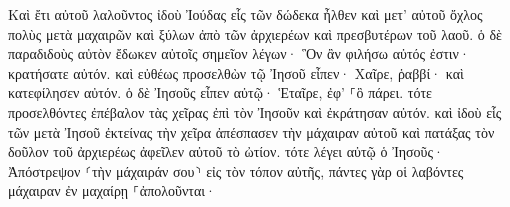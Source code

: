 \documentclass{openreader}
\begin{document}
Καὶ ἔτι αὐτοῦ λαλοῦντος ἰδοὺ Ἰούδας εἷς τῶν δώδεκα ἦλθεν καὶ μετ’ αὐτοῦ ὄχλος πολὺς μετὰ μαχαιρῶν καὶ ξύλων ἀπὸ τῶν ἀρχιερέων καὶ πρεσβυτέρων τοῦ λαοῦ. 
ὁ δὲ παραδιδοὺς αὐτὸν ἔδωκεν αὐτοῖς σημεῖον λέγων· Ὃν ἂν φιλήσω αὐτός ἐστιν· κρατήσατε αὐτόν. 
καὶ εὐθέως προσελθὼν τῷ Ἰησοῦ εἶπεν· Χαῖρε, ῥαββί· καὶ κατεφίλησεν αὐτόν. 
ὁ δὲ Ἰησοῦς εἶπεν αὐτῷ· Ἑταῖρε, ἐφ’ ⸀ὃ πάρει. τότε προσελθόντες ἐπέβαλον τὰς χεῖρας ἐπὶ τὸν Ἰησοῦν καὶ ἐκράτησαν αὐτόν. 
καὶ ἰδοὺ εἷς τῶν μετὰ Ἰησοῦ ἐκτείνας τὴν χεῖρα ἀπέσπασεν τὴν μάχαιραν αὐτοῦ καὶ πατάξας τὸν δοῦλον τοῦ ἀρχιερέως ἀφεῖλεν αὐτοῦ τὸ ὠτίον. 
τότε λέγει αὐτῷ ὁ Ἰησοῦς· Ἀπόστρεψον ⸂τὴν μάχαιράν σου⸃ εἰς τὸν τόπον αὐτῆς, πάντες γὰρ οἱ λαβόντες μάχαιραν ἐν μαχαίρῃ ⸀ἀπολοῦνται· 
\end{document}
